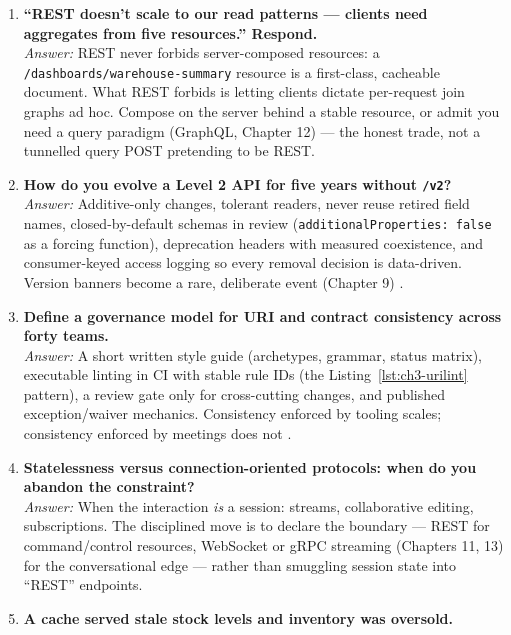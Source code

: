 \begin{enumerate}[label=\textbf{Q\arabic*.}, leftmargin=3.2em, itemsep=0.6em, resume]
  \item \textbf{``REST doesn't scale to our read patterns --- clients need
        aggregates from five resources.'' Respond.}\\
        \emph{Answer:} REST never forbids server-composed resources: a
        \texttt{/dashboards/warehouse-summary} resource is a first-class,
        cacheable document. What REST forbids is letting clients dictate
        per-request join graphs ad hoc. Compose on the server behind a stable
        resource, or admit you need a query paradigm (GraphQL, Chapter 12) ---
        the honest trade, not a tunnelled query POST pretending to be REST.
  \item \textbf{How do you evolve a Level 2 API for five years without
        \texttt{/v2}?}\\
        \emph{Answer:} Additive-only changes, tolerant readers, never reuse
        retired field names, closed-by-default schemas in review
        (\texttt{additionalProperties: false} as a forcing function),
        deprecation headers with measured coexistence, and consumer-keyed
        access logging so every removal decision is data-driven. Version
        banners become a rare, deliberate event (Chapter 9)
        \cite{gehl2021apidesign}.
  \item \textbf{Define a governance model for URI and contract consistency
        across forty teams.}\\
        \emph{Answer:} A short written style guide (archetypes, grammar, status
        matrix), executable linting in CI with stable rule IDs (the
        Listing~\ref{lst:ch3-urilint} pattern), a review gate only for
        cross-cutting changes, and published exception/waiver mechanics.
        Consistency enforced by tooling scales; consistency enforced by
        meetings does not \cite{gehl2021apidesign}.
  \item \textbf{Statelessness versus connection-oriented protocols: when do you
        abandon the constraint?}\\
        \emph{Answer:} When the interaction \emph{is} a session: streams,
        collaborative editing, subscriptions. The disciplined move is to
        declare the boundary --- REST for command/control resources, WebSocket
        or gRPC streaming (Chapters 11, 13) for the conversational edge ---
        rather than smuggling session state into ``REST'' endpoints.
  \item \textbf{A cache served stale stock levels and inventory was oversold.
}
\end{enumerate}
